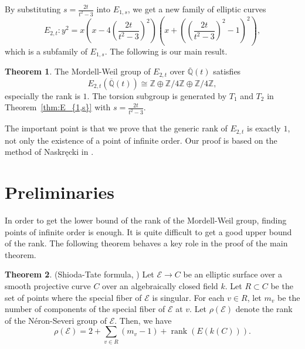 \documentclass[a4paper]{jarticle} %
\theoremstyle{definition}
\newtheorem{thm}{Theorem}[section]
\theoremstyle{remark}
\DeclareMathOperator{\rank}{rank}
\newcommand{\Neron}{N\'eron}
\begin{document}
By substituting $s = \frac{2t}{t^{2} - 3}$ into $E_{1,s}$, we get a new family of elliptic curves
\begin{equation*}
    E_{2,t}: y^{2} = x \left(x - 4 \left(\frac{2t}{t^{2} - 3} \right)^{2} \right) \left(x + \left(\left(\frac{2t}{t^{2} - 3} \right)^{2} - 1 \right)^{2} \right),
\end{equation*}
which is a subfamily of $E_{1,s}$.
The following is our main result.
\begin{thm}
    \label{thm:E_{2,t}}
    The Mordell-Weil group of $E_{2,t}$ over $\overline{\mathbb{Q}}(t)$ satisfies
    \begin{equation*}
        E_{2,t}(\overline{\mathbb{Q}}(t)) \cong \mathbb{Z} \oplus \mathbb{Z} / 4 \mathbb{Z} \oplus \mathbb{Z} / 4 \mathbb{Z},
    \end{equation*}
    especially the rank is $1$.
    The torsion subgroup is generated by $T_1$ and $T_2$ in Theorem~\ref{thm:E_{1,s}} with $s = \frac{2t}{t^{2} - 3}$.
\end{thm}
The important point is that we prove that the generic rank of $E_{2,t}$ is exactly $1$, not only the existence of a point of infinite order.
Our proof is based on the method of Naskręcki in \cite{ref:naskrecki2013}.


\section{Preliminaries}

In order to get the lower bound of the rank of the Mordell-Weil group, finding points of infinite order is enough.
It is quite difficult to get a good upper bound of the rank.
The following theorem behaves a key role in the proof of the main theorem.
\begin{thm}{(Shioda-Tate formula, \cite[Corollary 5.3]{ref:shioda1990})}
    \label{thm:shioda}
    Let $\mathcal{E} \to C$ be an elliptic surface over a smooth projective curve $C$ over an algebraically closed field $k$.
    Let $R \subset C$ be the set of points where the special fiber of $\mathcal{E}$ is singular.
    For each $v \in R$, let $m_{v}$ be the number of components of the special fiber of $\mathcal{E}$ at $v$.
    Let $\rho(\mathcal{E})$ denote the rank of the \Neron-Severi group of $\mathcal{E}$.
    Then, we have
    \begin{equation*}
        \rho (\mathcal{E}) = 2 + \sum_{v \in R} (m_{v} - 1) + \rank(E(k(C))).
    \end{equation*}
\end{thm}
\end{document}
